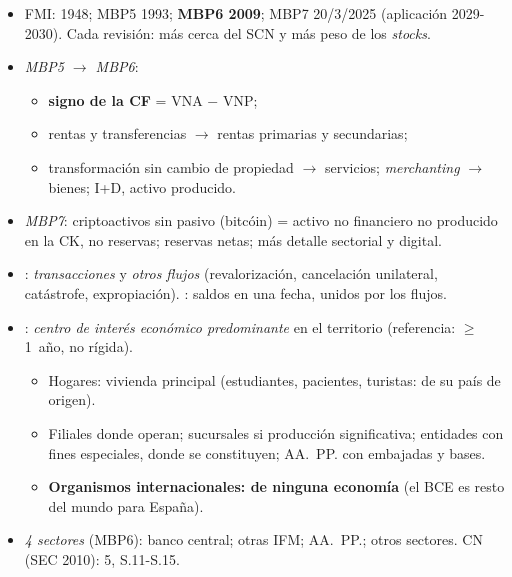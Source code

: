 \documentclass{article}
\begin{document}
\begin{columnas}
\begin{itemize}
\item FMI: 1948; MBP5 1993; \textbf{MBP6 2009}; MBP7 20/3/2025 (aplicación 2029-2030). Cada revisión: más cerca del SCN y más peso de los \emph{stocks}.
\item \emph{MBP5 $\to$ MBP6}:
  \begin{itemize}
  \item \textbf{signo de la CF} = VNA $-$ VNP;
  \item rentas y transferencias $\to$ rentas primarias y secundarias;
  \item transformación sin cambio de propiedad $\to$ servicios; \emph{merchanting} $\to$ bienes; I+D, activo producido.
  \end{itemize}
\item \emph{MBP7}: criptoactivos sin pasivo (bitcóin) = activo no financiero no producido en la CK, no reservas; reservas netas; más detalle sectorial y digital.
\end{itemize}
\begin{itemize}
\item {}: \emph{transacciones} y \emph{otros flujos} (revalorización, cancelación unilateral, catástrofe, expropiación). : saldos en una fecha, unidos por los flujos.
\end{itemize}
\begin{itemize}
\item {}: \emph{centro de interés económico predominante} en el territorio (referencia: $\geq$1~año, no rígida).
  \begin{itemize}
  \item Hogares: vivienda principal (estudiantes, pacientes, turistas: de su país de origen).
  \item Filiales donde operan; sucursales si producción significativa; entidades con fines especiales, donde se constituyen; AA.~PP. con embajadas y bases.
  \item \textbf{Organismos internacionales: de ninguna economía} (el BCE es resto del mundo para España).
  \end{itemize}
\item \emph{4 sectores} (MBP6): banco central; otras IFM; AA.~PP.; otros sectores. CN (SEC 2010): 5, S.11-S.15.
\end{itemize}

\end{columnas}
\end{document}
